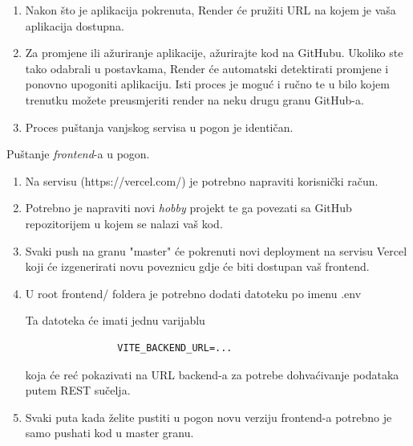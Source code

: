 \begin{enumerate}
			\item Nakon što je aplikacija pokrenuta, Render će pružiti URL na kojem je vaša aplikacija dostupna.
			
			\item Za promjene ili ažuriranje aplikacije, ažurirajte kod na GitHubu. Ukoliko ste tako odabrali u postavkama, Render će automatski detektirati promjene i ponovno upogoniti aplikaciju. Isti proces je moguć i ručno te u bilo kojem trenutku možete preusmjeriti render na neku drugu granu GitHub-a.
			
			\item Proces puštanja vanjskog servisa u pogon je identičan.
		\end{enumerate}
	
		Puštanje \textit{frontend}-a u pogon. 
			
			
			\begin{enumerate}
				
			\item Na servisu (https://vercel.com/) je potrebno napraviti korisnički račun.
			
			\item Potrebno je napraviti novi \textit{hobby} projekt te ga povezati sa GitHub repozitorijem u kojem se nalazi vaš kod.
			
			\item Svaki push na granu "master" će pokrenuti novi deployment na servisu Vercel koji će izgenerirati novu poveznicu gdje će biti dostupan vaš frontend. 
			
			\item U root frontend/ foldera je potrebno dodati datoteku po imenu .env
			
			Ta datoteka će imati jednu varijablu 
			\begin{verbatim}
				VITE_BACKEND_URL=...
			\end{verbatim}
			koja će reć pokazivati na URL backend-a za potrebe dohvaćivanje podataka putem REST sučelja.
			
			\item Svaki puta kada želite pustiti u pogon novu verziju frontend-a potrebno je samo pushati kod u master granu.
				
			\end{enumerate}
			
			
			\eject 
